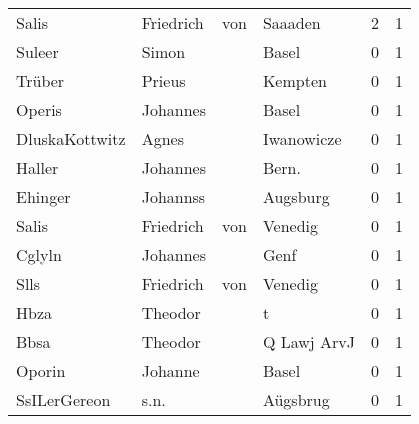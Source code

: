 \begin{center}
\begin{tiny}
\begin{longtabu}{llllrr}
                    Salis &                          Friedrich &         von &                                     Saaaden &          2 &         1 \\
                   Suleer &                              Simon &             &                                       Basel &          0 &         1 \\
                   Trüber &                             Prieus &             &                                     Kempten &          0 &         1 \\
                   Operis &                           Johannes &             &                                       Basel &          0 &         1 \\
           DluskaKottwitz &                              Agnes &             &                                  Iwanowicze &          0 &         1 \\
                   Haller &                           Johannes &             &                                      Bern.  &          0 &         1 \\
                  Ehinger &                           Johannss &             &                                    Augsburg &          0 &         1 \\
                    Salis &                          Friedrich &         von &                                     Venedig &          0 &         1 \\
                   Cglyln &                           Johannes &             &                                        Genf &          0 &         1 \\
                     Slls &                          Friedrich &         von &                                     Venedig &          0 &         1 \\
                     Hbza &                            Theodor &             &                                           t &          0 &         1 \\
                     Bbsa &                            Theodor &             &                                 Q Lawj ArvJ &          0 &         1 \\
                   Oporin &                            Johanne &             &                                       Basel &          0 &         1 \\
             SsILerGereon &                               s.n. &             &                                    Aügsbrug &          0 &         1 \\

\end{longtabu}
\end{tiny}
\end{center}
